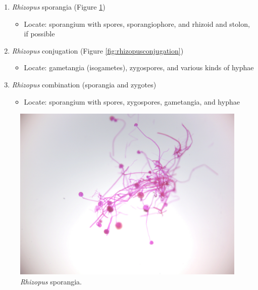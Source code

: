 \begin{enumerate}
\def\labelenumi{\arabic{enumi}.}
\tightlist
\item
  \emph{Rhizopus} sporangia (Figure \ref{fig:rhizopussporangia})

  \begin{itemize}
  \tightlist
  \item
    Locate: sporangium with spores, sporangiophore, and rhizoid and
    stolon, if possible
  \end{itemize}
\item
  \emph{Rhizopus} conjugation (Figure \ref{fig:rhizopusconjugation})

  \begin{itemize}
  \tightlist
  \item
    Locate: gametangia (isogametes), zygospores, and various kinds of
    hyphae
  \end{itemize}
\item
  \emph{Rhizopus} combination (sporangia and zygotes)

  \begin{itemize}
  \tightlist
  \item
    Locate: sporangium with spores, zygospores, gametangia, and hyphae
  \end{itemize}
\end{enumerate}



\begin{figure}

{\centering \includegraphics[width=0.7\linewidth]{./figures/fungi/rhizopus_sporangia}

}

\caption{\emph{Rhizopus} sporangia.}\label{fig:rhizopussporangia}
\end{figure}



